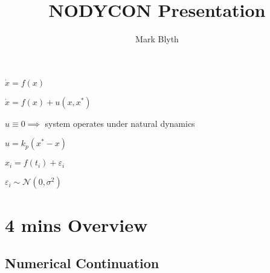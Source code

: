 \documentclass[11pt]{article}
\author{Mark Blyth}
\date{}
\title{NODYCON Presentation}
\begin{document}
\maketitle
\tableofcontents

\(\dot{x} = f(x)\)

\(\dot{x} = f(x) + u(x, x^*)\)

\(u \equiv 0 \implies\) system operates under natural dynamics

\(u = k_p(x^* - x)\)

\(x_i = f(t_i) + \varepsilon_i\)

\(\varepsilon_i \sim \mathcal{N}(0, \sigma^2)\)

\section{4 mins Overview}
\label{sec:orge460c03}
\subsection{Numerical Continuation}
\label{sec:orga34ee9f}
\end{document}
